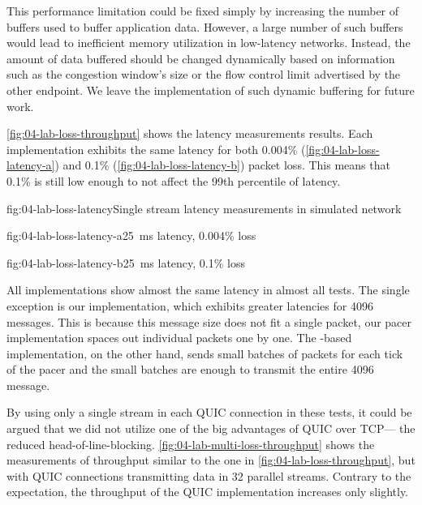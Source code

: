 This performance limitation could be fixed simply by increasing the number of buffers used to buffer
application data. However, a large number of such buffers would lead to inefficient memory
utilization in low-latency networks. Instead, the amount of data buffered should be changed
dynamically based on information such as the congestion window's size or the flow control limit
advertised by the other endpoint. We leave the implementation of such dynamic buffering for future
work.

\autoref{fig:04-lab-loss-throughput} shows the latency measurements results. Each implementation
exhibits the same latency for both 0.004\% (\autoref{fig:04-lab-loss-latency-a}) and 0.1\%
(\autoref{fig:04-lab-loss-latency-b}) packet loss. This means that 0.1\% is still low enough to not
affect the 99th percentile of latency.

\begin{myFigure}{fig:04-lab-loss-latency}{Single stream latency measurements in simulated network}
\begin{mySubfigure}{0.49\linewidth}{fig:04-lab-loss-latency-a}{\SI{25}{\milli\second} latency, 0.004\% loss}
\footnotesize

\end{mySubfigure}
\begin{mySubfigure}{0.49\linewidth}{fig:04-lab-loss-latency-b}{\SI{25}{\milli\second} latency, 0.1\% loss}
\footnotesize

\end{mySubfigure}
\end{myFigure}

All implementations show almost the same latency in almost all tests. The single exception is our
implementation, which exhibits greater latencies for \SI{4096}{\byte} messages. This is because this
message size does not fit a single packet, our pacer implementation spaces out individual packets
one by one. The \libmsquic{}-based implementation, on the other hand, sends small batches of packets
for each tick of the pacer and the small batches are enough to transmit the entire \SI{4096}{\byte}
message.

By using only a single stream in each QUIC connection in these tests, it could be argued that we did
not utilize one of the big advantages of QUIC over TCP\@ --- the reduced \gls{head-of-line-blocking}.
\autoref{fig:04-lab-multi-loss-throughput} shows the measurements of throughput similar to the one
in \autoref{fig:04-lab-loss-throughput}, but with QUIC connections transmitting data in 32 parallel
streams. Contrary to the expectation, the throughput of the QUIC implementation increases only
slightly.

